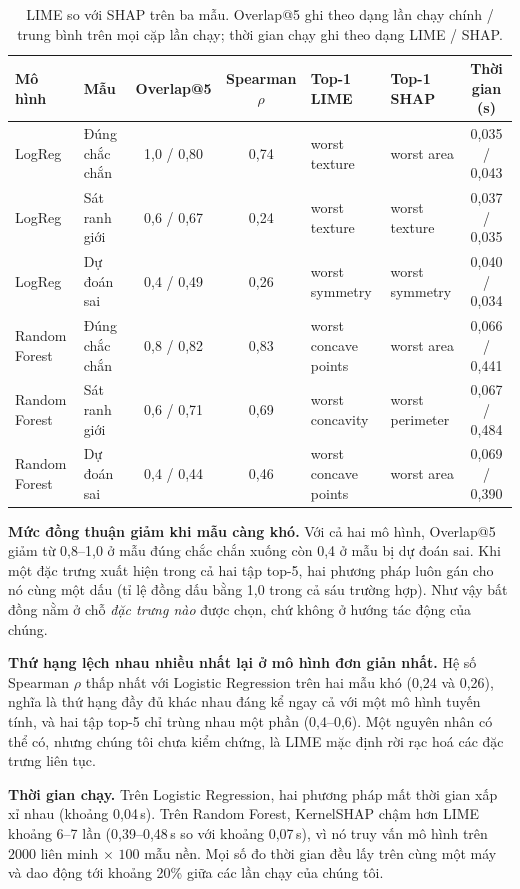 \documentclass[11pt,a4paper]{article}
\begin{document}
\begin{table}[!htb]
\centering\footnotesize
\caption{LIME so với SHAP trên ba mẫu. Overlap@5 ghi theo dạng lần chạy chính
/ trung bình trên mọi cặp lần chạy; thời gian chạy ghi theo dạng LIME /
SHAP.}\label{tab:compare}
\setlength{\tabcolsep}{3pt}
\begin{tabular}{@{}L{1.9cm}L{2.2cm}ccL{2.3cm}L{2.3cm}c@{}}
\toprule
\textbf{Mô hình} & \textbf{Mẫu} & \textbf{Overlap@5} & \textbf{Spearman $\rho$} & \textbf{Top-1 LIME} & \textbf{Top-1 SHAP} & \textbf{Thời gian (s)}\\
\midrule
LogReg & Đúng chắc chắn & 1,0 / 0,80 & 0,74 & worst texture & worst area & 0,035 / 0,043\\
LogReg & Sát ranh giới & 0,6 / 0,67 & 0,24 & worst texture & worst texture & 0,037 / 0,035\\
LogReg & Dự đoán sai & 0,4 / 0,49 & 0,26 & worst symmetry & worst symmetry & 0,040 / 0,034\\
Random Forest & Đúng chắc chắn & 0,8 / 0,82 & 0,83 & worst concave points & worst area & 0,066 / 0,441\\
Random Forest & Sát ranh giới & 0,6 / 0,71 & 0,69 & worst concavity & worst perimeter & 0,067 / 0,484\\
Random Forest & Dự đoán sai & 0,4 / 0,44 & 0,46 & worst concave points & worst area & 0,069 / 0,390\\
\bottomrule
\end{tabular}
\end{table}

\textbf{Mức đồng thuận giảm khi mẫu càng khó.} Với cả hai mô hình, Overlap@5
giảm từ 0,8--1,0 ở mẫu đúng chắc chắn xuống còn 0,4 ở mẫu bị dự đoán sai. Khi
một đặc trưng xuất hiện trong cả hai tập top-5, hai phương pháp luôn gán cho
nó cùng một dấu (tỉ lệ đồng dấu bằng 1,0 trong cả sáu trường hợp). Như vậy
bất đồng nằm ở chỗ \emph{đặc trưng nào} được chọn, chứ không ở hướng tác động
của chúng.

\textbf{Thứ hạng lệch nhau nhiều nhất lại ở mô hình đơn giản nhất.} Hệ số
Spearman $\rho$ thấp nhất với Logistic Regression trên hai mẫu khó (0,24 và
0,26), nghĩa là thứ hạng đầy đủ khác nhau đáng kể ngay cả với một mô hình
tuyến tính, và hai tập top-5 chỉ trùng nhau một phần (0,4--0,6). Một nguyên
nhân có thể có, nhưng chúng tôi chưa kiểm chứng, là LIME mặc định rời rạc hoá
các đặc trưng liên tục.

\textbf{Thời gian chạy.} Trên Logistic Regression, hai phương pháp mất thời
gian xấp xỉ nhau (khoảng 0,04\,s). Trên Random Forest, KernelSHAP chậm hơn
LIME khoảng 6--7 lần (0,39--0,48\,s so với khoảng 0,07\,s), vì nó truy vấn mô
hình trên $2000$ liên minh $\times$ $100$ mẫu nền. Mọi số đo thời gian đều
lấy trên cùng một máy và dao động tới khoảng 20\% giữa các lần chạy của chúng
tôi.
\end{document}
